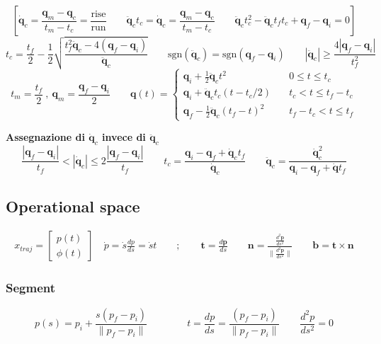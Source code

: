$$
\left[
\bm{\dot{q}}_c 
= 
\frac{\bm{q}_m - \bm{q}_c}{t_m - t_c}
=
\frac{\text{rise}}{\text{run}}
\qquad
\bm{\ddot{q}}_c t_c
=
\bm{\dot{q}}_c
=
\frac{\bm{q}_m - \bm{q}_c}{t_m - t_c}
\qquad
\bm{\ddot{q}}_ct_c^2
-
\bm{\ddot{q}}_c t_f t_c
+
\bm{q}_f - \bm{q}_i = 0
\right]
$$
\vspace*{10pt}
$$
t_c
=
\frac{t_f}{2} - \frac{1}{2}
\sqrt{
	\frac{t_f^2 \ddot{\bm{q}}_c - 4(\bm{q}_f - \bm{q}_i)}{\bm{\ddot{q}}_c}
}
\qquad
\text{sgn}(\ddot{\bm{q}}_c)
=
\text{sgn}(\bm{q}_f - \bm{q}_i)
\qquad
|\ddot{\bm{q}}_c| \ge \frac{4|\bm{q}_f - \bm{q}_i|}{t_f^2}
$$
\vspace*{10pt}
$$
t_m = \frac{t_f}{2} \ , \ \bm{q}_m = \frac{\bm{q}_f - \bm{q}_i}{2}
\qquad
\bm{q}(t)
=
\begin{cases}
	\bm{q}_i + \frac{1}{2} \ddot{\bm{q}}_c t^2 & \quad 0 \leq t \leq t_c \\
	\bm{q}_i + \ddot{\bm{q}}_c t_c (t - t_c/2) & \quad t_c < t \leq t_f - t_c \\
	\bm{q}_f - \frac{1}{2} \ddot{\bm{q}}_c (t_f - t)^2 & \quad t_f - t_c < t \leq t_f
\end{cases}
$$


\vspace*{10pt}
\textbf{Assegnazione di $\bm{\dot{q}}_c$ invece di $\bm{\ddot{q}}_c$}
\vspace*{5pt}
$$
\frac{|\bm{q}_f - \bm{q}_i|}{t_f}
<
|\bm{\dot{q}}_c|
\leq
2 \frac{|\bm{q}_f - \bm{q}_i|}{t_f}
\qquad
t_c = \frac{\bm{q}_i - \bm{q}_f + \bm{\dot{q}}_c t_f }{\dot{\bm{q}}_c}
\qquad
\bm{\ddot{q}}_c
=
\frac{\bm{\dot{q}}_c^2}{\bm{q}_i - \bm{q}_f + \bm{\dot{q}} t_f}
$$





\subsection{Operational space}
\begin{align*}
	x_{traj} = \begin{bmatrix}p(t) \\ \phi(t) \end{bmatrix}
	\quad
	\dot{p} = \dot{s} \frac{dp}{ds} = \dot{s}{t}
	\qquad ; \qquad
	\bm{t} = \frac{d\bm{p}}{ds}
	\qquad
	\bm{n} = \frac{\frac{d^2 \bm{p}}{ds^2}}{\| \frac{d^2 \bm{p}}{ds^2} \|}
	\qquad
	\bm{b} = \bm{t} \times \bm{n}
\end{align*}


\subsubsection{Segment}
$$
p(s) = p_i + \frac{s(p_f - p_i)}{\| p_f - p_i \|}
\qquad \qquad
t = \frac{dp}{ds} = \frac{(p_f - p_i)}{\| p_f - p_i \|}
\qquad
\frac{d^2p}{ds^2} = 0
$$

